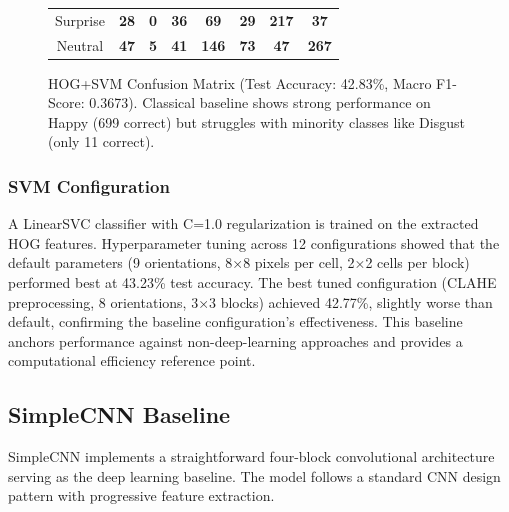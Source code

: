 \documentclass[12pt,a4paper]{article}
\begin{document}
\begin{figure}[h!]
\begin{tabular}{|c||ccccccc|}
Surprise & \cellcolor[HTML]{F5F5FF}\textcolor[HTML]{000000}{\textbf{28}} & \cellcolor[HTML]{F5F5FF}\textcolor[HTML]{000000}{\textbf{0}} & \cellcolor[HTML]{F5F5FF}\textcolor[HTML]{000000}{\textbf{36}} & \cellcolor[HTML]{F5F5FF}\textcolor[HTML]{000000}{\textbf{69}} & \cellcolor[HTML]{F5F5FF}\textcolor[HTML]{000000}{\textbf{29}} & \cellcolor[HTML]{C8D5F0}\textcolor[HTML]{000000}{\textbf{217}} & \cellcolor[HTML]{F5F5FF}\textcolor[HTML]{000000}{\textbf{37}} \\
Neutral & \cellcolor[HTML]{F5F5FF}\textcolor[HTML]{000000}{\textbf{47}} & \cellcolor[HTML]{F5F5FF}\textcolor[HTML]{000000}{\textbf{5}} & \cellcolor[HTML]{F5F5FF}\textcolor[HTML]{000000}{\textbf{41}} & \cellcolor[HTML]{C8D5F0}\textcolor[HTML]{000000}{\textbf{146}} & \cellcolor[HTML]{F5F5FF}\textcolor[HTML]{000000}{\textbf{73}} & \cellcolor[HTML]{F5F5FF}\textcolor[HTML]{000000}{\textbf{47}} & \cellcolor[HTML]{C8D5F0}\textcolor[HTML]{000000}{\textbf{267}} \\
\hline
\end{tabular}
    \caption{HOG+SVM Confusion Matrix (Test Accuracy: 42.83\%, Macro F1-Score: 0.3673). Classical baseline shows strong performance on Happy (699 correct) but struggles with minority classes like Disgust (only 11 correct).}
    \label{fig:hog_svm_matrix}
\end{figure}

\subsubsection{SVM Configuration}
A LinearSVC classifier with C=1.0 regularization is trained on the extracted HOG features. Hyperparameter tuning across 12 configurations showed that the default parameters (9 orientations, 8×8 pixels per cell, 2×2 cells per block) performed best at 43.23\% test accuracy. The best tuned configuration (CLAHE preprocessing, 8 orientations, 3×3 blocks) achieved 42.77\%, slightly worse than default, confirming the baseline configuration's effectiveness. This baseline anchors performance against non-deep-learning approaches and provides a computational efficiency reference point.

\subsection{SimpleCNN Baseline}
SimpleCNN implements a straightforward four-block convolutional architecture serving as the deep learning baseline. The model follows a standard CNN design pattern with progressive feature extraction.
\end{document}
